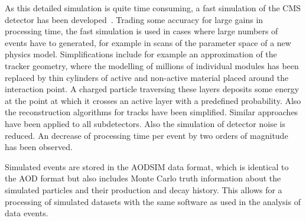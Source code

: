 As this detailed simulation is quite time consuming, a fast simulation of the CMS detector has been developed~\cite{1742-6596-331-3-032049}. Trading some accuracy for large gains in processing time, the fast simulation is used in cases where large numbers of events have to generated, for example in scans of the parameter space of a new physics model. Simplifications include for example an approximation of the tracker geometry, where the modelling of millions of individual modules has been replaced by thin cylinders of active and non-active material placed around the interaction point. A charged particle traversing these layers deposits some energy at the point at which it crosses an active layer with a predefined probability. Also the reconstruction algorithms for tracks have been simplified. Similar approaches have been applied to all subdetectors. Also the simulation of detector noise is reduced. An decrease of processing time per event by two orders of magnitude has been observed. 

Simulated events are stored in the AODSIM data format, which is identical to the AOD format but also includes Monte Carlo truth information about the simulated particles and their production and decay history. This allows for a processing of simulated datasets with the same software as used in the analysis of data events. 

